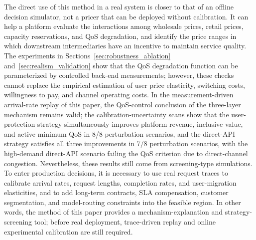 \documentclass[11pt,a4paper]{article}
\begin{document}
The direct use of this method in a real system is closer to that of an offline decision simulator, not a pricer that can be deployed without calibration. It can help a platform evaluate the interactions among wholesale prices, retail prices, capacity reservations, and QoS degradation, and identify the price ranges in which downstream intermediaries have an incentive to maintain service quality. The experiments in Sections~\ref{sec:robustness_ablation} and~\ref{sec:realism_validation} show that the QoS degradation function can be parameterized by controlled back-end measurements; however, these checks cannot replace the empirical estimation of user price elasticity, switching costs, willingness to pay, and channel operating costs. In the measurement-driven arrival-rate replay of this paper, the QoS-control conclusion of the three-layer mechanism remains valid; the calibration-uncertainty scans show that the user-protection strategy simultaneously improves platform revenue, inclusive value, and active minimum QoS in 8/8 perturbation scenarios, and the direct-API strategy satisfies all three improvements in 7/8 perturbation scenarios, with the high-demand direct-API scenario failing the QoS criterion due to direct-channel congestion. Nevertheless, these results still come from screening-type simulations. To enter production decisions, it is necessary to use real request traces to calibrate arrival rates, request lengths, completion rates, and user-migration elasticities, and to add long-term contracts, SLA compensation, customer segmentation, and model-routing constraints into the feasible region. In other words, the method of this paper provides a mechanism-explanation and strategy-screening tool; before real deployment, trace-driven replay and online experimental calibration are still required.
\end{document}
